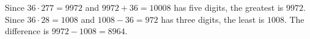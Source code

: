 Since $36\cdot277=9972$ and $9972+36=10008$ has five digits, the greatest is $9972$. Since $36\cdot28=1008$ and $1008-36=972$ has three digits, the least is $1008$. The difference is $9972-1008=\boxed{8964}$.
